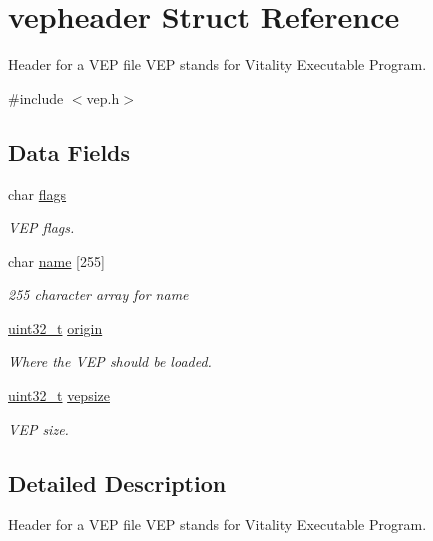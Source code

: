 \hypertarget{a00080}{}\section{vepheader Struct Reference}
\label{a00080}


Header for a V\+EP file V\+EP stands for Vitality Executable Program.  




{\ttfamily \#include $<$vep.\+h$>$}

\subsection*{Data Fields}
\begin{DoxyCompactItemize}
\item 
char \hyperlink{a00080_ad19a09798439f6a12c5794c2ce224e9b_ad19a09798439f6a12c5794c2ce224e9b}{flags}
\begin{DoxyCompactList}\small\item\em V\+EP flags. \end{DoxyCompactList}\item 
char \hyperlink{a00080_ab1972b24045dbe7a528c6d79ffd2a5ad_ab1972b24045dbe7a528c6d79ffd2a5ad}{name} \mbox{[}255\mbox{]}
\begin{DoxyCompactList}\small\item\em 255 character array for name \end{DoxyCompactList}\item 
\hyperlink{a00047_a435d1572bf3f880d55459d9805097f62_a435d1572bf3f880d55459d9805097f62}{uint32\+\_\+t} \hyperlink{a00080_aa81b6806dd33022ce60c314c908ba028_aa81b6806dd33022ce60c314c908ba028}{origin}
\begin{DoxyCompactList}\small\item\em Where the V\+EP should be loaded. \end{DoxyCompactList}\item 
\hyperlink{a00047_a435d1572bf3f880d55459d9805097f62_a435d1572bf3f880d55459d9805097f62}{uint32\+\_\+t} \hyperlink{a00080_a6121693fa5ac3673d831b440aea8963e_a6121693fa5ac3673d831b440aea8963e}{vepsize}
\begin{DoxyCompactList}\small\item\em V\+EP size. \end{DoxyCompactList}\end{DoxyCompactItemize}


\subsection{Detailed Description}
Header for a V\+EP file V\+EP stands for Vitality Executable Program. 

